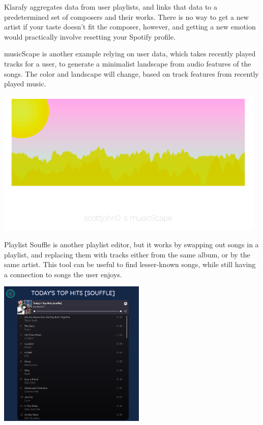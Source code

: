 Klarafy aggregates data from user playlists, and links that data to a
predetermined set of composers and their works. There is no way to get a new
artist if your taste doesn't fit the composer, however, and getting a new
emotion would practically  involve resetting your Spotify profile.

musicScape \cite{Aleksik:18} is another example relying on user data, which
takes recently played tracks for a user, to generate a minimalist landscape from
audio features of the songs. The color and landscape will change, based on track
features from recently played music.

\begin{center}\includegraphics[height=7cm]{images/musicScape.png}
\end{center}

Playlist Souffle \cite{Hammer:18} is another playlist editor, but it works by
swapping out songs in a playlist, and replacing them with tracks either from the
same album, or by the same artist. This tool can be useful to find lesser-known
songs, while still having a connection to songs the user enjoys.

\begin{center}\includegraphics[height=7cm]{images/souffle.png}
\end{center}

